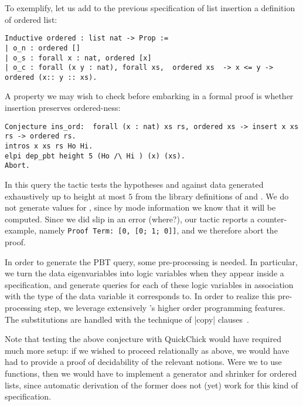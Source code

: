 To exemplify, let us add to the previous specification of list
insertion a definition of ordered list:
\begin{lstlisting}
Inductive ordered : list nat -> Prop :=
| o_n : ordered []
| o_s : forall x : nat, ordered [x]
| o_c : forall (x y : nat), forall xs,  ordered xs  -> x <= y -> ordered (x:: y :: xs).     
\end{lstlisting}
%
A property we may wish to check before embarking in a formal proof is
whether insertion preserves ordered-ness:
\begin{lstlisting}
Conjecture ins_ord:  forall (x : nat) xs rs, ordered xs -> insert x xs rs -> ordered rs.
intros x xs rs Ho Hi.
elpi dep_pbt height 5 (Ho /\ Hi ) (x) (xs).
Abort.
\end{lstlisting}
In this query the tactic tests the hypotheses  and 
against data  generated exhaustively up to height
at most $5$  from the library  definitions of
 and . We do not generate values for ,
since by mode information we know that it will be computed.
%
Since we did slip in an error (where?), our tactic reports a
counter-example, namely \verb|Proof Term: [0, [0; 1; 0]]|, and
we therefore abort the proof.


In order to generate the PBT query, some
pre-processing is needed. In particular, we turn the data
eigenvariables into \lP logic variables when they appear inside a
specification, and  generate queries %
for each of
these logic variables in association with the type of the data
variable it corresponds to.  In order to realize this pre-processing step,
we leverage extensively \lP's higher order programming features. The
substitutions are handled with the technique of \lsti|copy| clauses~\cite{miller91jlc}.

Note that testing the above conjecture with \textsf{QuickChick} would
have required much more setup: if we wished to proceed relationally as
above, we would have had to provide a proof of decidability of the
relevant notions. Were we to use functions, then we would have to
implement a generator and shrinker for ordered lists, since automatic
derivation of the former does not (yet) work for this kind of specification.


